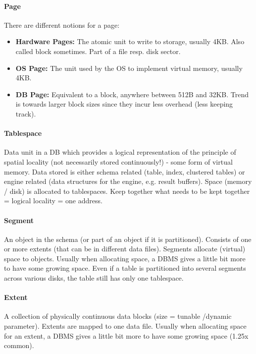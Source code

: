 

\paragraph{Page}
There are different notions for a page:
\begin{itemize}
    \item \textbf{Hardware Pages:} The atomic unit to write to storage, usually 4KB. Also called block sometimes. Part of a file resp. disk sector.
    \item \textbf{OS Page:} The unit used by the OS to implement virtual memory, usually 4KB.
    \item \textbf{DB Page:} Equivalent to a block, anywhere between 512B and 32KB. Trend is towards larger block sizes since they incur less overhead (less keeping track).
\end{itemize}

\paragraph{Tablespace}
Data unit in a DB which provides a logical representation of the principle of spatial locality (not necessarily stored continuously!) - some form of virtual memory. Data stored is either schema related (table, index, clustered tables) or engine related (data structures for the engine, e.g. result buffers). Space (memory / disk) is allocated to tablespaces. Keep together what needs to be kept together = logical locality = one address.

\paragraph{Segment}
An object in the schema (or part of an object if it is partitioned). Consists of one or more extents (that can be in different data files). Segments allocate (virtual) space to objects. Usually when allocating space, a DBMS gives a little bit more to have some growing space. Even if a table is partitioned into several segments across various disks, the table still has only one tablespace.

\paragraph{Extent}
A collection of physically continuous data blocks (size = tunable /dynamic parameter). Extents are mapped to one data file. Usually when allocating space for an extent, a DBMS gives a little bit more to have some growing space (1.25x common).

